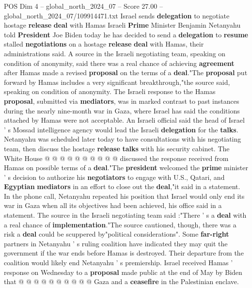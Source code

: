 \begin{textsample}{POS Dim 4 – global\_north\_2024\_07 – Score 27.00 – global\_north\_2024\_07/109914471.txt}  \label{ex:f4_pos_193}
Israel sends \textbf{delegation} to negotiate hostage \textbf{release} \textbf{deal} with Hamas Israeli \textbf{Prime} Minister Benjamin Netanyahu told \textbf{President} Joe Biden today he has decided to send a \textbf{delegation} to \textbf{resume} stalled \textbf{negotiations} on a hostage \textbf{release} \textbf{deal} with Hamas, their administrations said.
A source in the Israeli negotiating team, speaking on condition of anonymity, said there was a real chance of achieving \textbf{agreement} after Hamas made a revised \textbf{proposal} on the terms of a \textbf{deal}."The \textbf{proposal} put forward by Hamas includes a very significant breakthrough,"the source said, speaking on condition of anonymity.
The Israeli response to the Hamas \textbf{proposal}, submitted via \textbf{mediators}, was in marked contrast to past instances during the nearly nine-month war in Gaza, where Israel has said the conditions attached by Hamas were not acceptable.
An Israeli official said the head of Israel ' s Mossad intelligence agency would lead the Israeli \textbf{delegation} for the \textbf{talks}.
Netanyahu was scheduled later today to have consultations with his negotiating team, then discuss the hostage \textbf{release} \textbf{talks} with his security cabinet.
The White House @ @ @ @ @ @ @ @ @ @ discussed the response received from Hamas on possible terms of a \textbf{deal}."The \textbf{president} welcomed the \textbf{prime} minister ' s decision to authorize his \textbf{negotiators} to engage with U.S., Qatari, and \textbf{Egyptian} \textbf{mediators} in an effort to close out the \textbf{deal},"it said in a statement.
In the phone call, Netanyahu repeated his position that Israel would only end its war in Gaza when all its objectives had been achieved, his office said in a statement.
The source in the Israeli negotiating team said :"There ' s a \textbf{deal} with a real chance of \textbf{implementation}."The source cautioned, though, there was a risk a \textbf{deal} could be scuppered by"political considerations".
Some \textbf{far-right} partners in Netanyahu ' s ruling coalition have indicated they may quit the government if the war ends before Hamas is destroyed.
Their departure from the coalition would likely end Netanyahu ' s premiership.
Israel received Hamas ' response on Wednesday to a \textbf{proposal} made public at the end of May by Biden that @ @ @ @ @ @ @ @ @ @ Gaza and a \textbf{ceasefire} in the Palestinian enclave.

\end{textsample}
